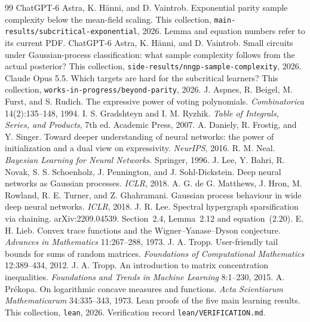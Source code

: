 \documentclass[11pt]{article}
\theoremstyle{definition}\newtheorem{assumption}[theorem]{Assumption}
\theoremstyle{remark}\newtheorem{remark}[theorem]{Remark}
\begin{document}
\begin{thebibliography}{99}
ChatGPT-6 Astra, K. H\"anni, and D. Vaintrob.
Exponential parity sample complexity below the mean-field scaling.
This collection, \texttt{main-results/subcritical-exponential}, 2026.
Lemma and equation numbers refer to its current PDF.
ChatGPT-6 Astra, K. H\"anni, and D. Vaintrob.
Small circuits under Gaussian-process classification: what sample
complexity follows from the actual posterior?
This collection, \texttt{side-results/nngp-sample-complexity}, 2026.
Claude Opus 5.5. Which targets are hard for the subcritical learners?
This collection, \texttt{works-\allowbreak in-\allowbreak progress/\allowbreak beyond-parity}, 2026.
J. Aspnes, R. Beigel, M. Furst, and S. Rudich.
The expressive power of voting polynomials.
\emph{Combinatorica} 14(2):135--148, 1994.
I. S. Gradshteyn and I. M. Ryzhik. \emph{Table of Integrals, Series, and
Products}, 7th ed. Academic Press, 2007.
A. Daniely, R. Frostig, and Y. Singer. Toward deeper understanding of
neural networks: the power of initialization and a dual view on
expressivity. \emph{NeurIPS}, 2016.
R. M. Neal. \emph{Bayesian Learning for Neural Networks}. Springer, 1996.
J. Lee, Y. Bahri, R. Novak, S. S. Schoenholz, J. Pennington, and
J. Sohl-Dickstein. Deep neural networks as Gaussian processes.
\emph{ICLR}, 2018.
A. G. de G. Matthews, J. Hron, M. Rowland, R. E. Turner, and
Z. Ghahramani. Gaussian process behaviour in wide deep neural networks.
\emph{ICLR}, 2018.
J. R. Lee. Spectral hypergraph sparsification via chaining.
arXiv:2209.04539. Section~2.4, Lemma~2.12 and equation~(2.20).
E. H. Lieb. Convex trace functions and the Wigner--Yanase--Dyson
conjecture. \emph{Advances in Mathematics} 11:267--288, 1973.
J. A. Tropp. User-friendly tail bounds for sums of random matrices.
\emph{Foundations of Computational Mathematics} 12:389--434, 2012.
J. A. Tropp. An introduction to matrix concentration inequalities.
\emph{Foundations and Trends in Machine Learning} 8:1--230, 2015.
A. Pr\'ekopa. On logarithmic concave measures and functions.
\emph{Acta Scientiarum Mathematicarum} 34:335--343, 1973.
Lean proofs of the five main learning results.
This collection, \texttt{lean}, 2026. Verification record
\texttt{lean/\allowbreak VERIFICATION.md}.
\end{thebibliography}
\end{document}
